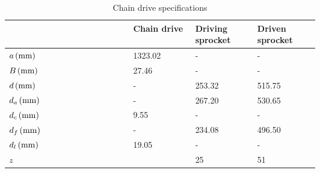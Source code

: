 \begin{table}[ht]
	\centering
	\begin{tabular}{lp{0.2\linewidth}p{0.2\linewidth}p{0.2\linewidth}}\toprule
		& Chain drive & Driving sprocket & Driven sprocket \\ \midrule
		$ a\, (\mathrm{mm})    $	&	1323.02	&	-		&	-		\\
		$ B\, (\mathrm{mm})    $	&	27.46	&	-		&	-		\\
		$ d\, (\mathrm{mm})    $	&	-		&	253.32	&	515.75	\\
		$ d_a\, (\mathrm{mm})  $	&	-		&	267.20	&	530.65	\\
		$ d_c\, (\mathrm{mm})  $	&	9.55	&	-		&	-		\\
		$ d_f\, (\mathrm{mm})  $	&	-		&	234.08	&	496.50	\\
		$ d_l\, (\mathrm{mm})  $	&	19.05	&	-		&	-		\\
		$ z              $	&			&	25		&	51		\\\bottomrule
	\end{tabular}
	\caption{Chain drive specifications}
\end{table}